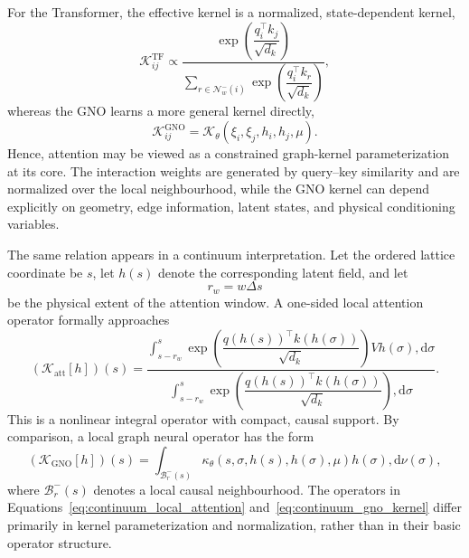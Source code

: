For the Transformer, the effective kernel is a normalized, state-dependent kernel,
\begin{equation}
\mathcal{K}_{ij}^{\mathrm{TF}}
\propto
\frac{
\exp\left(
\dfrac{
q_i^{\top} k_j
}{
\sqrt{d_k}
}
\right)
}{
\displaystyle
\sum_{r \in \mathcal{N}_{w}^{-}(i)}
\exp\left(
\dfrac{
q_i^{\top} k_r
}{
\sqrt{d_k}
}
\right)
},
\label{eq:tf_normalized_kernel}
\end{equation}
whereas the GNO learns a more general kernel directly,
\begin{equation}
\mathcal{K}_{ij}^{\mathrm{GNO}}
=
\mathcal{K}_{\theta}
\left(
\xi_i,
\xi_j,
h_i,
h_j,
\mu
\right).
\label{eq:gno_general_kernel}
\end{equation}
Hence, attention may be viewed as a constrained graph-kernel parameterization at its core. The interaction weights are generated by query--key similarity and are normalized over the local neighbourhood, while the GNO kernel can depend explicitly on geometry, edge information, latent states, and physical conditioning variables.

The same relation appears in a continuum interpretation. Let the ordered lattice coordinate be $s$, let $h(s)$ denote the corresponding latent field, and let
\begin{equation}
r_w
=
w \Delta s
\end{equation}
be the physical extent of the attention window. A one-sided local attention operator formally approaches
\begin{equation}
\left(
\mathcal{K}_{\mathrm{att}}[h]
\right)(s)
=
\frac{
\displaystyle
\int_{s-r_w}^{s}
\exp\left(
\dfrac{
q(h(s))^{\top}
k(h(\sigma))
}{
\sqrt{d_k}
}
\right)
V h(\sigma)
,\mathrm{d}\sigma
}{
\displaystyle
\int_{s-r_w}^{s}
\exp\left(
\dfrac{
q(h(s))^{\top}
k(h(\sigma))
}{
\sqrt{d_k}
}
\right)
,\mathrm{d}\sigma
}.
\label{eq:continuum_local_attention}
\end{equation}
This is a nonlinear integral operator with compact, causal support. By comparison, a local graph neural operator has the form
\begin{equation}
\left(
\mathcal{K}_{\mathrm{GNO}}[h]
\right)(s)
=
\int_{\mathcal{B}_{r}^{-}(s)}
\kappa_{\theta}
\left(
s,
\sigma,
h(s),
h(\sigma),
\mu
\right)
h(\sigma)
,\mathrm{d}\nu(\sigma),
\label{eq:continuum_gno_kernel}
\end{equation}
where $\mathcal{B}_{r}^{-}(s)$ denotes a local causal neighbourhood. The operators in Equations~\eqref{eq:continuum_local_attention} and~\eqref{eq:continuum_gno_kernel} differ primarily in kernel parameterization and normalization, rather than in their basic operator structure.

